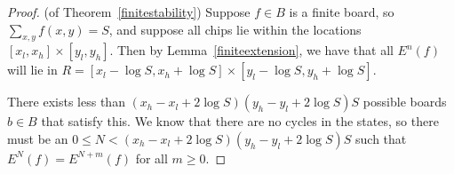 \documentclass[11pt]{article}
\begin{document}
\begin{proof}
(of Theorem~\ref{finitestability}) Suppose $f \in B$ is a finite board, so $\sum_{x,y} f(x,y) = S$, and suppose all chips lie within the locations $[x_l, x_h] \times [y_l, y_h]$. Then by Lemma~\ref{finiteextension}, we have that all $E^n(f)$ will lie in $R = [x_l - \log S, x_h + \log S] \times [y_l - \log S, y_h + \log S]$. 

There exists less than $(x_h - x_l + 2\log S)(y_h - y_l + 2\log S)S$ possible boards $b \in B$ that satisfy this. We know that there are no cycles in the states, so there must be an $0 \leq N < (x_h - x_l + 2\log S)(y_h - y_l + 2\log S)S$ such that $E^N(f) = E^{N+m}(f)$ for all $m \geq 0$.
\end{proof}
\end{document}

